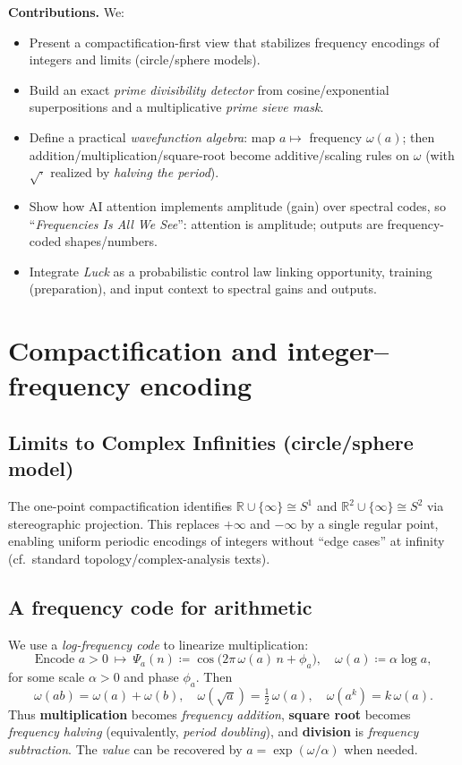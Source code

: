 \documentclass[12pt]{article}
\newcommand{\R}{\mathbb{R}}
\newcommand{\W}{\Psi}                    %
\begin{document}
\textbf{Contributions.} We:
\begin{itemize}
  \item Present a compactification-first view that stabilizes frequency encodings of integers and limits (circle/sphere models).
  \item Build an exact \emph{prime divisibility detector} from cosine/exponential superpositions and a multiplicative \emph{prime sieve mask}.
  \item Define a practical \emph{wavefunction algebra}: map $a\mapsto$ frequency $\omega(a)$; then addition/multiplication/square-root become additive/scaling rules on $\omega$ (with $\sqrt{\cdot}$ realized by \emph{halving the period}).
  \item Show how AI attention implements amplitude (gain) over spectral codes, so “\emph{Frequencies Is All We See}”: attention is amplitude; outputs are frequency-coded shapes/numbers.
  \item Integrate \emph{Luck} as a probabilistic control law linking opportunity, training (preparation), and input context to spectral gains and outputs.
\end{itemize}

\section{Compactification and integer--frequency encoding}
\subsection{Limits to Complex Infinities (circle/sphere model)}
The one-point compactification identifies $\R\cup\{\infty\}\cong S^1$ and $\R^2\cup\{\infty\}\cong S^2$ via stereographic projection. This replaces $+\infty$ and $-\infty$ by a single regular point, enabling uniform periodic encodings of integers without “edge cases” at infinity (cf.\ standard topology/complex-analysis texts).

\subsection{A frequency code for arithmetic}
We use a \emph{log-frequency code} to linearize multiplication:
\begin{equation}
\label{eq:logfreq}
\text{Encode } a>0 \ \mapsto\ \W_a(n) \coloneqq \cos\!\big(2\pi\, \omega(a)\, n + \phi_a\big),
\quad \omega(a) \coloneqq \alpha \log a,
\end{equation}
for some scale $\alpha>0$ and phase $\phi_a$. Then
\[
\omega(ab)=\omega(a)+\omega(b), \quad
\omega(\sqrt{a})=\tfrac12\,\omega(a), \quad
\omega(a^k)=k\,\omega(a).
\]
Thus \textbf{multiplication} becomes \emph{frequency addition}, \textbf{square root} becomes \emph{frequency halving} (equivalently, \emph{period doubling}), and \textbf{division} is \emph{frequency subtraction}. The \emph{value} can be recovered by $a=\exp(\omega/\alpha)$ when needed.
\end{document}
